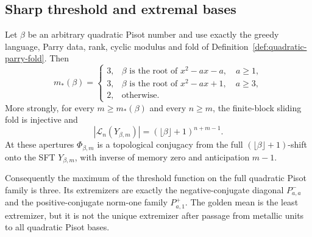\subsection{Sharp threshold and extremal bases}

\begin{theorem}
\label{thm:full-quadratic-pisot-threshold}
Let $\beta$ be an arbitrary quadratic Pisot number and use exactly the
greedy language, Parry data, rank, cyclic modulus and fold of
Definition~\ref{def:quadratic-parry-fold}.  Then
\[
m_*(\beta)=
\begin{cases}
3,&\beta\text{ is the root of }x^2-ax-a,\quad a\ge1,\\
3,&\beta\text{ is the root of }x^2-ax+1,\quad a\ge3,\\
2,&\text{otherwise}.
\end{cases}
\]
More strongly, for every $m\ge m_*(\beta)$ and every $n\ge m$, the
finite-block sliding fold is injective and
\begin{equation}
|\mathcal L_n(Y_{\beta,m})|
=(\lfloor\beta\rfloor+1)^{n+m-1}.
\label{eq:quadratic-pisot-block-count}
\end{equation}
At these apertures $\Phi_{\beta,m}$ is a topological conjugacy from the full
$(\lfloor\beta\rfloor+1)$-shift onto the SFT $Y_{\beta,m}$, with inverse of
memory zero and anticipation $m-1$.

Consequently the maximum of the threshold function on the full quadratic
Pisot family is three.  Its extremizers are exactly the negative-conjugate
diagonal $P^-_{a,a}$ and the positive-conjugate norm-one family
$P^+_{a,1}$.  The golden mean is the least extremizer, but it is not the
unique extremizer after passage from metallic units to all quadratic Pisot
bases.
\end{theorem}

